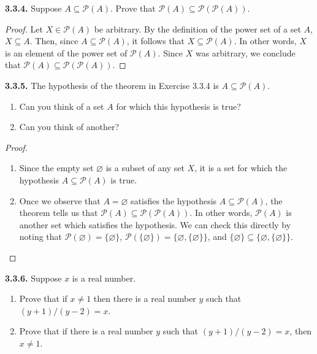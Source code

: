 \documentclass[12pt]{amsart}
\newenvironment{statement}[1]{\smallskip\noindent\color[rgb]{.6627, .3529, .6314} {\bf #1.}}{}
\theoremstyle{definition}
\theoremstyle{remark}
\begin{document}
\begin{statement}{3.3.4}
Suppose $A \subseteq \mathscr{P}(A)$.
Prove that $\mathscr{P}(A) \subseteq \mathscr{P}(\mathscr{P}(A))$.
\end{statement}

\begin{proof}
Let $X \in \mathscr{P}(A)$ be arbitrary.
By the definition of the power set of a set $A$, $X \subseteq A$.
Then, since $A \subseteq \mathscr{P}(A)$, it follows that $X \subseteq \mathscr{P}(A)$.
In other words, $X$ is an element of the power set of $\mathscr{P}(A)$.
Since $X$ was arbitrary, we conclude that $\mathscr{P}(A) \subseteq \mathscr{P}(\mathscr{P}(A))$.
\end{proof}


\begin{statement}{3.3.5}
The hypothesis of the theorem in Exercise 3.3.4 is $A \subseteq \mathscr{P}(A)$.
\begin{enumerate}
	\item Can you think of a set $A$ for which this hypothesis is true?
	
	\item Can you think of another?
\end{enumerate}
\end{statement}

\begin{proof}
\hfill
\begin{enumerate}
	\item Since the empty set $\varnothing$ is a subset of any set $X$, it is a set for which the
	hypothesis $A \subseteq \mathscr{P}(A)$ is true.
	
	\item Once we observe that $A = \varnothing$ satisfies the hypothesis
	$A \subseteq \mathscr{P}(A)$, the theorem tells us that 
	$\mathscr{P}(A) \subseteq \mathscr{P}(\mathscr{P}(A))$.
	In other words, $\mathscr{P}(A)$ is another set which satisfies the hypothesis.
	We can check this directly by noting that $\mathscr{P}(\varnothing) = \{ \varnothing \}$,
	$\mathscr{P}(\{ \varnothing \}) = \{ \varnothing, \{ \varnothing \} \}$,
	and $\{ \varnothing \} \subseteq \{ \varnothing, \{ \varnothing \} \}$.
\end{enumerate}
\end{proof}


\begin{statement}{3.3.6}
Suppose $x$ is a real number.
\begin{enumerate}
	\item Prove that if $x \neq 1$ then there is a real number $y$ such that $(y + 1)/(y - 2) = x$.
	
	\item Prove that if there is a real number $y$ such that $(y + 1)/(y - 2) = x$, then $x \neq 1$.
\end{enumerate}
\end{statement}
\end{document}
